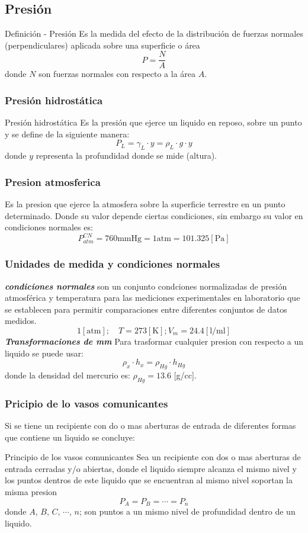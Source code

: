 \subsection*{Presión}
\begin{Theorem*} {Definición - Presión}
	Es la medida del efecto de la distribución de fuerzas normales (perpendiculares) aplicada sobre una superficie o área
	$$ P = \frac{N}{A} $$
	donde $N$ son fuerzas normales con respecto a la área $A$.
\end{Theorem*}
\subsubsection*{Presión hidrostática}
\begin{Theorem*} {Presión hidrostática}
	Es la presión que ejerce un liquido en reposo, sobre un punto y se define de la siguiente manera:
	$$ P_L=\gamma_L\cdot y=\rho_L\cdot g\cdot y $$
	donde $y$ representa la profundidad donde se mide (altura).
\end{Theorem*}
\subsubsection*{Presion atmosferica}
Es la presion que ejerce la atmosfera sobre la superficie terrestre en un punto determinado.
Donde su valor depende ciertas condiciones, sin embargo su valor en condiciones normales es:
$$ P_{atm}^{CN}=760\mathrm{mmHg}=1\mathrm{atm}=101.325\mathrm{[Pa]} $$
\subsubsection*{Unidades de medida y condiciones normales}
\textbf{\textit{condiciones normales}} son un conjunto condciones normalizadas de presión atmosférica y temperatura para las mediciones experimentales en laboratorio que se establecen para permitir comparaciones entre diferentes conjuntos de datos medidos.
$$ 1\mathrm{[atm]}; \quad T=273\mathrm{[K]}; V_m=24.4\mathrm{[l/ml]} $$
\textbf{\textit{Transformaciones de mm}} Para trasformar cualquier presion con respecto a un liquido se puede usar:
$$ \rho_x\cdot h_x = \rho_{Hg}\cdot h_{Hg} $$
donde la densidad del mercurio es: $\rho_{Hg}=13.6$ [g/cc].
\subsubsection*{Pricipio de lo vasos comunicantes}
Si se tiene un recipiente con do o mas aberturas de entrada de diferentes formas que contiene un liquido se concluye: 
\begin{Theorem*} {Principio de los vasos comunicantes}
	Sea un recipiente con dos o mas aberturas de entrada cerradas y/o abiertas, donde el liquido siempre alcanza el mismo nivel y los puntos dentros de este liquido que se encuentran al mismo nivel soportan la misma presion
	$$ P_A=P_B=\cdots=P_n $$
	donde $A$, $B$, $C$, $\cdots$, $n$; son puntos a un mismo nivel de profundidad dentro de un liquido.
\end{Theorem*}
